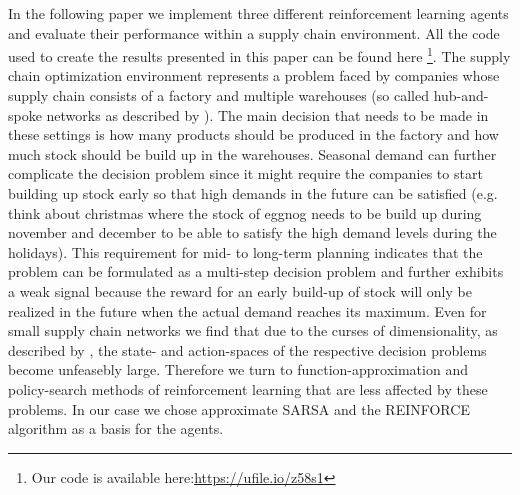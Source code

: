 \documentclass[journal, a4paper]{IEEEtran}
\theoremstyle{plain}
\theoremstyle{definition}
\begin{document}
In the following paper we implement three different reinforcement learning agents and evaluate their performance within a supply chain environment. All the code used to create the results presented in this paper can be found here \footnote{Our code is available here:\url{https://ufile.io/z58s1}}. \newline
The supply chain optimization environment represents a problem faced by companies whose supply chain consists of a factory and multiple warehouses (so called hub-and-spoke networks as described by \cite{MFL}). The main decision that needs to be made in these settings is how many products should be produced in the factory and how much stock should be build up in the warehouses. Seasonal demand can further complicate the decision problem since it might require the companies to start building up stock early so that high demands in the future can be satisfied (e.g. think about christmas where the stock of eggnog needs to be build up during november and december to be able to satisfy the high demand levels during the holidays). This requirement for mid- to long-term planning indicates that the problem can be formulated as a multi-step decision problem and further exhibits a weak signal because the reward for an early build-up of stock will only be realized in the future when the actual demand reaches its maximum. \newline
Even for small supply chain networks we find that due to the curses of dimensionality, as described by \cite{PowellADP}, the state- and action-spaces of the respective decision problems become unfeasebly large. Therefore we turn to function-approximation and policy-search methods of reinforcement learning that are less affected by these problems. In our case we chose approximate SARSA and the REINFORCE algorithm as a basis for the agents.
\end{document}
